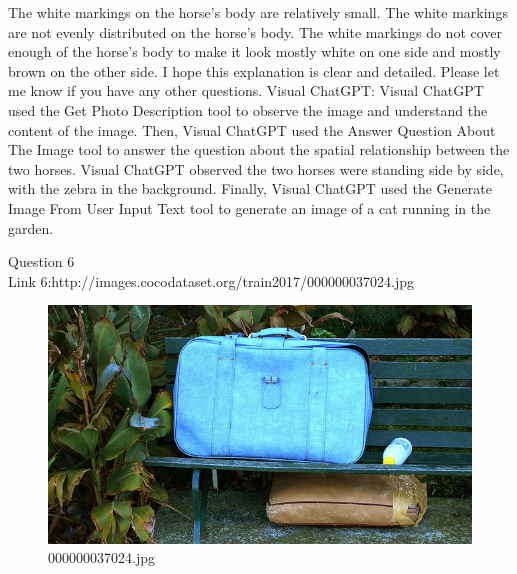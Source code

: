 \begin{enumerate}
        The white markings on the horse's body are relatively small.
        The white markings are not evenly distributed on the horse's body.
        The white markings do not cover enough of the horse's body to make it look mostly white on one side and mostly brown on the other side.
        I hope this explanation is clear and detailed. Please let me know if you have any other questions.
        \subitem Visual ChatGPT: Visual ChatGPT used the Get Photo Description tool to observe the image and understand the content of the image. Then, Visual ChatGPT used the Answer Question About The Image tool to answer the question about the spatial relationship between the two horses. Visual ChatGPT observed the two horses were standing side by side, with the zebra in the background. Finally, Visual ChatGPT used the Generate Image From User Input Text tool to generate an image of a cat running in the garden.
    \end{enumerate}
Question 6\\
Link 6:http://images.cocodataset.org/train2017/000000037024.jpg
    \begin{figure}[h]
        \centering
        \includegraphics[width=0.8\linewidth]{../image set/easy/000000037024.jpg}
        \caption{000000037024.jpg}
    \end{figure}
